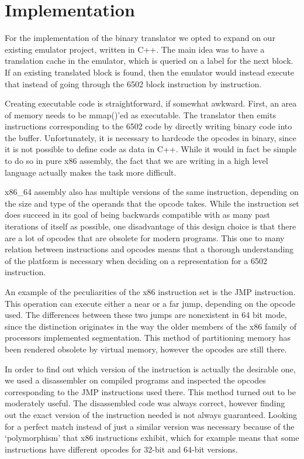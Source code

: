 \section{Implementation}

For the implementation of the binary translator we opted to expand on our
existing emulator project, written in C++.  The main idea was to have a
translation cache in the emulator, which is queried on a label for the next
block.  If an existing translated block is found, then the emulator would
instead execute that instead of going through the 6502 block instruction by
instruction.

Creating executable code is straightforward, if somewhat awkward. First, an
area of memory needs to be mmap()'ed as executable.  The translator then emits
instructions corresponding to the 6502 code by directly writing binary code
into the buffer.  Unfortunately, it is necessary to hardcode the opcodes in
binary, since it is not possible to define code as data in C++.  While it would
in fact be simple to do so in pure x86 assembly, the fact that we are writing
in a high level language actually makes the task more difficult.

x86\_64 assembly also has multiple versions of the same instruction, depending
on the size and type of the operands that the opcode takes.  While the
instruction set does succeed in its goal of being backwards compatible with as
many past iterations of itself as possible, one disadvantage of this design
choice is that there are a lot of opcodes that are obsolete for modern
programs.  This one to many relation between instructions and opcodes means
that a thorough understanding of the platform is necessary when deciding on a
representation for a 6502 instruction.

An example of the peculiarities of the x86 instruction set is the JMP
instruction.  This operation can execute either a near or a far jump, depending
on the opcode used.  The differences between these two jumps are nonexistent in
64 bit mode, since the distinction originates in the way the older members of
the x86 family of processors implemented segmentation.  This method of
partitioning memory has been rendered obsolete by virtual memory, however the
opcodes are still there.

In order to find out which version of the instruction is actually the desirable
one, we used a disassembler on compiled programs and inspected the opcodes
corresponding to the JMP instructions used there.  This method turned out to be
moderately useful. The disassembled code was always correct, however finding
out the exact version of the instruction needed is not always guaranteed.
Looking for a perfect match instead of just a similar version was necessary
because of the `polymorphism' that x86 instructions exhibit, which for example
means that some instructions have different opcodes for 32-bit and 64-bit
versions.

